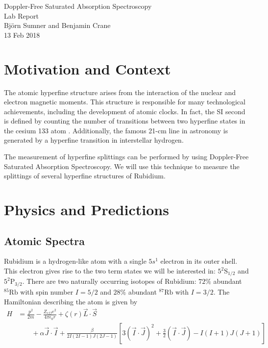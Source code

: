 \documentclass[12pt]{article}
\begin{document}
\begin{center}
{\Large Doppler-Free Saturated Absorption Spectroscopy} \\
{\Large Lab Report} \\[.3in]
{\large Bj\"{o}rn Sumner and Benjamin Crane} \\
{13 Feb 2018}
\end{center}

\section*{Motivation and Context}

The atomic hyperfine structure arises from the interaction of the nuclear and electron magnetic moments.  This structure is responsible for many technological achievements, including the development of atomic clocks.  In fact, the SI second is defined by counting the number of transitions between two hyperfine states in the cesium 133 atom \cite{NISTsec}.  Additionally, the famous 21-cm line in astronomy is generated by a hyperfine transition in interstellar hydrogen\cite{21cmPred}.

The measurement of hyperfine splittings can be performed by using Doppler-Free Saturated Absorption Spectroscopy.  We will use this technique to measure the splittings of several hyperfine structures of Rubidium.

\section*{Physics and Predictions}

\subsection*{Atomic Spectra}
Rubidium is a hydrogen-like atom with a single $5s^1$ electron in its outer shell.  This electron gives rise to the two term states we will be interested in: $5^2\text{S}_{1/2}$ and $5^2\text{P}_{3/2}$.  There are two naturally occurring isotopes of Rubidium: $72\%$ abundant ${}^{85}\text{Rb}$ with spin number $I=5/2$ and $28\%$ abundant ${}^{87}\text{Rb}$ with $I = 3/2$.
The Hamiltonian describing the atom is given by
\begin{align}
	H &= \frac{p^2}{2m} - \frac{Z_{eff} e^2}{4 \pi \epsilon_0 r} + \zeta(r) \vec{L}\cdot \vec{S} \nonumber\\
	&\qquad + \alpha \vec{J}\cdot \vec{I} + \frac{\beta}{2I(2I-1)J(2J-1)}\left[3(\vec{I}\cdot \vec{J})^2 + \frac{3}{2}(\vec{I}\cdot \vec{J}) - I(I+1)J(J+1)\right] \label{eq:hamiltonian}
\end{align}
\end{document}
